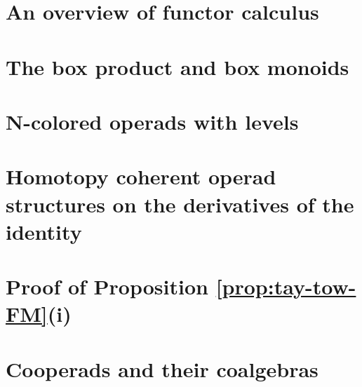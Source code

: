 \documentclass[11pt, twoside]{report}
\theoremstyle{definition}
\theoremstyle{remark}
\begin{document}
\chapter[Functor calculus]{An overview of functor calculus} 


\chapter[The box product]{The box product and box monoids}


\chapter[N-colored operads with levels]{$\mathbf{N}$-colored operads with levels}


\chapter[Derivatives of the identity]{Homotopy coherent operad structures on the derivatives of the identity}


\begingroup
{}


\endgroup

\appendix

\chapter[]{Proof of Proposition {\ref{prop:tay-tow-FM}}(i)}
\label{app:n-ex}


\chapter{Cooperads and their coalgebras}
\label{app:coop}

\end{document}
